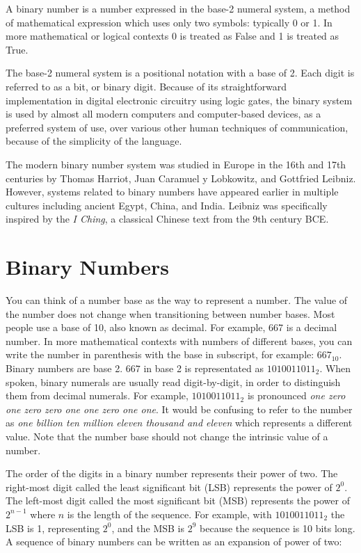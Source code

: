 \documentclass[11pt]{book}
\begin{document}
A binary number is a number expressed in the base-2 numeral system, a method of mathematical expression which uses only two symbols: typically 0 or 1. In more mathematical or logical contexts 0 is treated as False and 1 is treated as True.

The base-2 numeral system is a positional notation with a base of 2. Each digit is referred to as a bit, or binary digit. Because of its straightforward implementation in digital electronic circuitry using logic gates, the binary system is used by almost all modern computers and computer-based devices, as a preferred system of use, over various other human techniques of communication, because of the simplicity of the language.

The modern binary number system was studied in Europe in the 16th and 17th centuries by Thomas Harriot, Juan Caramuel y Lobkowitz, and Gottfried Leibniz. However, systems related to binary numbers have appeared earlier in multiple cultures including ancient Egypt, China, and India. Leibniz was specifically inspired by the \textit{I Ching}, a classical Chinese text from the 9th century BCE. 

\section{Binary Numbers\label{sec:data:bases}}

You can think of a number base as the way to represent a number. The value of the number does not change when transitioning between number bases. Most people use a base of 10, also known as decimal. For example, 667 is a decimal number. In more mathematical contexts with numbers of different bases, you can write the number in parenthesis with the base in subscript, for example: $667_{10}$. Binary numbers are base 2. $667$ in base 2 is representated as 
$1010011011_2$. When spoken, binary numerals are usually read digit-by-digit, in order to distinguish them from decimal numerals. For example, $1010011011_2$ is pronounced \textit{one zero one zero zero one one zero one one}. It would be confusing to refer to the number as \textit{one billion ten million eleven thousand and eleven} which represents a different value. Note that the number base should not change the intrinsic value of a number.

The order of the digits in a binary number represents their power of two. The right-most digit called the least significant bit (LSB) represents the power of $2^0$. The left-most digit called the most significant bit (MSB) represents the power of $2^{n-1}$ where $n$ is the length of the sequence. For example, with $1010011011_2$ the LSB is 1, representing $2^0$, and the MSB is $2^9$ because the sequence is 10 bits long. A sequence of binary numbers can be written as an expansion of power of two:
\end{document}

